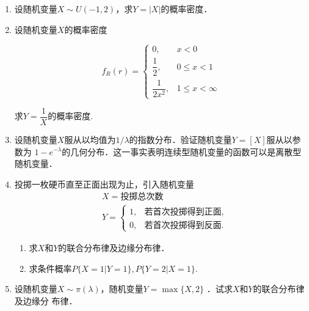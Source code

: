 \documentclass[10pt,a4paper]{article}
\begin{document}
\begin{enumerate}
    \item 设随机变量$X\sim U(-1,2)$，求$Y=|X|$的概率密度．
    


    \item 设随机变量$X$的概率密度

    \vspace{-0.5cm}
    \begin{spacing}{2}
    $$f_R(r)=\left\{\begin{array}{ll}
        0, & x<0\\
        \dfrac{1}{2}, & 0\leq x <1\\
        \dfrac{1}{2x^2}, & 1\leq x <\infty
    \end{array}\right.$$
    \end{spacing}
    求$Y=\dfrac{1}{X}$的概率密度.



    \item 设随机变量$X$服从以均值为$1/\lambda$的指数分布．验证随机变量$Y=[X]$服从以参数为
    $1-e^{-\lambda}$的几何分布．这一事实表明连续型随机变量的函数可以是离散型随机变量．





    \item 投掷一枚硬币直至正面出现为止，引入随机变量
    \begin{equation}
        \begin{split}
            &X=\mbox{投掷总次数}\\
            &Y=\left\{\begin{array}{ll}
                1, & \mbox{若首次投掷得到正面},\\
                0, & \mbox{若首次投掷得到反面}.
            \end{array}\right.
        \end{split}
        \nonumber
    \end{equation}
    \begin{enumerate}
        \item 求$X$和$Y$的联合分布律及边缘分布律．
        \item 求条件概率$P\{X=1|Y=1\},P\{Y=2|X=1\}$.
    \end{enumerate}
        


    
    \item 设随机变量$X\sim \pi(\lambda)$，随机变量$Y=\max\{X,2\}$ ．试求$X$和$Y$的联合分布律及边缘分
    布律．





\end{enumerate}
\end{document}
